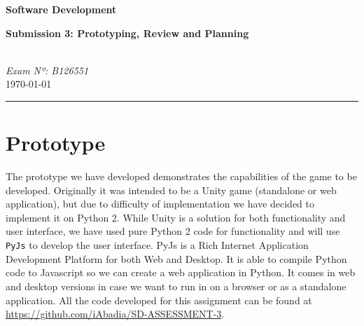 \documentclass{article}
\begin{document}
\begin{center}
	\begin{Huge}
	\textbf{Software Development}\\
	\end{Huge}
	\begin{small}
		\textbf{Submission 3: Prototyping, Review and Planning}
	\end{small}
\end{center}

\begin{small}
\textit{\\Exam Nº: B126551}\\
\today
\end{small}

\begin{center}
	\noindent\rule[0.5ex]{\linewidth}{1pt}
\end{center}

\section{Prototype}
The prototype we have developed demonstrates the capabilities of the game to be developed. Originally it was intended to be a Unity game (standalone or web application), but due to difficulty of implementation we have decided to implement it on Python 2. While Unity is a solution for both functionality and user interface, we have used pure Python 2 code for functionality and will use \texttt{PyJs} to develop the user interface. PyJs is a Rich Internet Application Development Platform for both Web and Desktop. It is able to compile Python code to Javascript so we can create a web application in Python. It comes in web and desktop versions in case we want to run in on a browser or as a standalone application. All the code developed for this assignment can be found at \url{https://github.com/iAbadia/SD-ASSESSMENT-3}.
\end{document}
